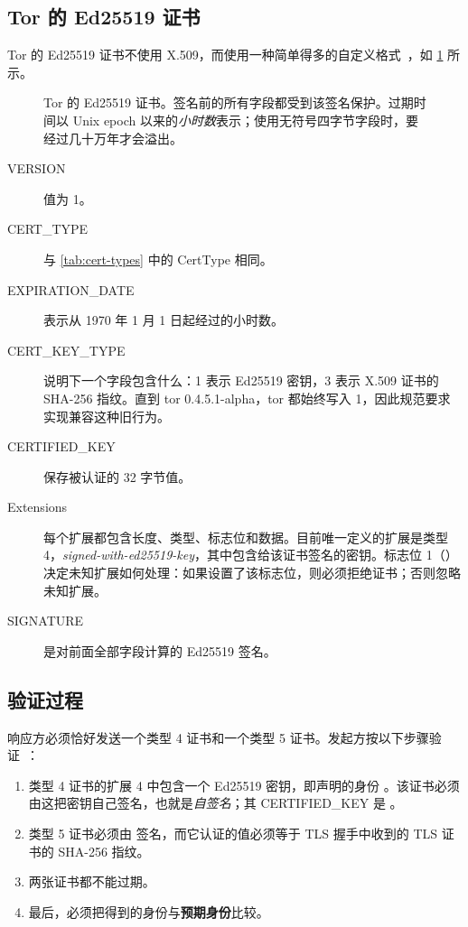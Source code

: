 \subsection{Tor 的 Ed25519 证书}

Tor 的 Ed25519 证书不使用 X.509，而使用一种简单得多的自定义格式~，如 \cref{fig:cert-ed} 所示。

\begin{figure}[htbp]
\centering

\caption{Tor 的 Ed25519 证书。签名前的所有字段都受到该签名保护。过期时间以 Unix epoch 以来的\emph{小时数}表示；使用无符号四字节字段时，要经过几十万年才会溢出。}
\label{fig:cert-ed}
\end{figure}

\begin{description}
  \item[VERSION] 值为 1。
  \item[CERT\_TYPE] 与 \cref{tab:cert-types} 中的 CertType 相同。
  \item[EXPIRATION\_DATE] 表示从 1970 年 1 月 1 日起经过的小时数。
  \item[CERT\_KEY\_TYPE] 说明下一个字段包含什么：1 表示 Ed25519 密钥，3 表示 X.509 证书的 SHA-256 指纹。直到 tor 0.4.5.1-alpha，tor 都始终写入 1，因此规范要求实现兼容这种旧行为。
  \item[CERTIFIED\_KEY] 保存被认证的 32 字节值。
  \item[Extensions] 每个扩展都包含长度、类型、标志位和数据。目前唯一定义的扩展是类型 4，\emph{signed-with-ed25519-key}，其中包含给该证书签名的密钥。标志位 1（）决定未知扩展如何处理：如果设置了该标志位，则必须拒绝证书；否则忽略未知扩展。
  \item[SIGNATURE] 是对前面全部字段计算的 Ed25519 签名。
\end{description}

\subsection{验证过程}\label{sec:canale-verifica}

响应方必须恰好发送一个类型 4 证书和一个类型 5 证书。发起方按以下步骤验证~：
\begin{enumerate}
  \item 类型 4 证书的扩展 4 中包含一个 Ed25519 密钥，即声明的身份 。该证书必须由这把密钥自己签名，也就是\emph{自签名}；其 CERTIFIED\_KEY 是 。
  \item 类型 5 证书必须由  签名，而它认证的值必须等于 TLS 握手中收到的 TLS 证书的 SHA-256 指纹。
  \item 两张证书都不能过期。
  \item 最后，必须把得到的身份与\textbf{预期身份}比较。
\end{enumerate}

